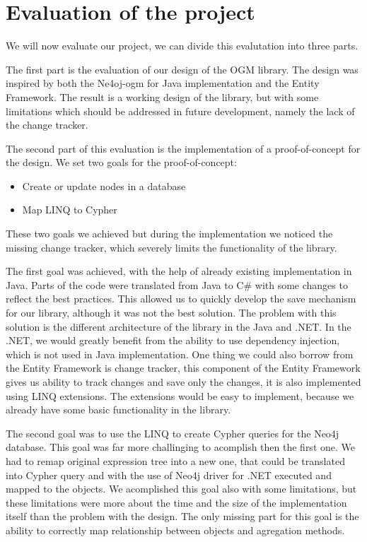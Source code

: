 \chapter{Evaluation of the project}

We will now evaluate our project, we can divide this evalutation into three parts.

The first part is the evaluation of our design of the OGM library. The design was inspired by both the Ne4oj-\acrshort{ogm} for Java implementation and the Entity Framework.
The result is a working design of the library, but with some limitations which should be addressed in future development, namely the lack of the change tracker.

The second part of this evaluation is the implementation of a proof-of-concept for the design.
We set two goals for the proof-of-concept:
\begin{itemize}
    \item {Create or update nodes in a database}
    \item {Map LINQ to Cypher}
\end{itemize}
These two goals we achieved but during the implementation we noticed the missing change tracker, which severely limits the functionality of the library.

The first goal was achieved, with the help of already existing implementation in Java. Parts of the code were translated from Java to C\# with some changes to reflect the best practices.
This allowed us to quickly develop the save mechanism for our library, although it was not the best solution.
The problem with this solution is the different architecture of the library in the Java and .NET.
In the .NET, we would greatly benefit from the ability to use dependency injection, which is not used in Java implementation.
One thing we could also borrow from the Entity Framework is change tracker, this component of the Entity Framework gives us ability to track changes and save only the changes, it is also implemented using LINQ extensions.
The extensions would be easy to implement, because we already have some basic functionality in the library.

The second goal was to use the LINQ to create Cypher queries for the Neo4j database.
This goal was far more challinging to acomplish then the first one.
We had to remap original expression tree into a new one, that could be translated into Cypher query and with the use of Neo4j driver for .NET executed and mapped to the objects.
We acomplished this goal also with some limitations, but these limitations were more about the time and the size of the implementation itself than the problem with the design.
The only missing part for this goal is the ability to correctly map relationship between objects and agregation methods.


